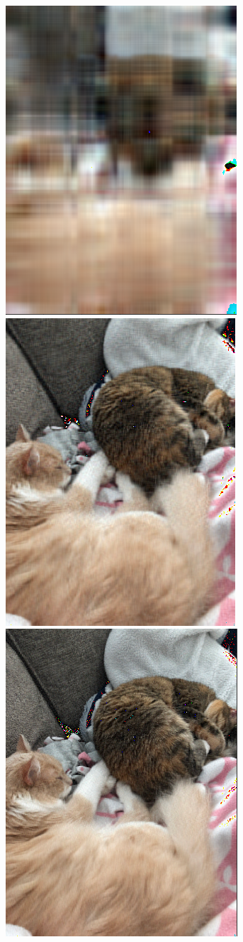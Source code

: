 \documentclass[letterpaper,12pt]{article}
\begin{document}
\begin{center}
\includegraphics[scale=.4]{col5.png}
\includegraphics[scale=.4]{col50.png}
\includegraphics[scale=.4]{col100.png}
\end{center}
\end{document}
